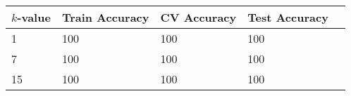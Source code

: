 \def\arraystretch{1.25}
\begin{table}[H]
\centering
\begin{tabular}{l l l l l}
\hline
\hline
\textbf{$k$-value} & \textbf{Train Accuracy} & \textbf{CV Accuracy} & \textbf{Test Accuracy}\\
\hline
\hline
1 & 100 & 100 & 100 \\
7 & 100 & 100 & 100 \\
15 & 100 & 100 & 100 \\

\hline
\end{tabular}
\setcounter{table}{0}
\end{table}